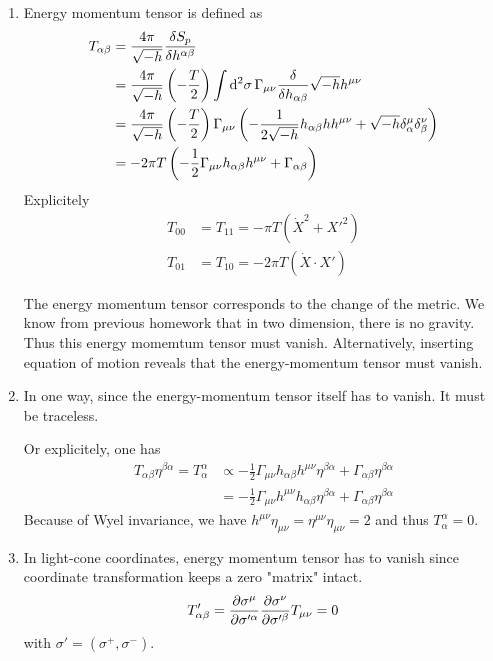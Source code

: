 \begin{enumerate}[label=(\alph*)]
	\item Energy momentum tensor is defined as 
		\begin{align}
			T_{\alpha\beta} &= \frac{4\pi}{\sqrt{-h}} \frac{\delta S_p}{\delta h^{\alpha\beta}} \notag \\
								 &= \frac{4\pi}{\sqrt{-h}} \left( - \frac{T}{2} \right) \int \dd[2]{\sigma} \Gamma_{\mu\nu} \frac{\delta}{\delta h_{\alpha\beta}} \sqrt{-h} h^{\mu\nu} \notag \\
								 &= \frac{4\pi}{\sqrt{-h}} \left( - \frac{T}{2} \right) \Gamma_{\mu\nu} \left( - \frac{1}{2\sqrt{-h}} h_{\alpha\beta} h  h^{\mu\nu}     + \sqrt{-h} \delta^\mu_\alpha \delta^\nu_\beta \right) \notag \\
								 &= - 2 \pi T \left( - \frac{1}{2} \Gamma_{\mu\nu} h_{\alpha\beta} h^{\mu\nu} + \Gamma_{\alpha\beta} \right) 
		\end{align}
		Explicitely
		\begin{align*}
			T_{00} &= T_{11} = - \pi T (\dot{X}^2 + X'^2)\\
			T_{01} &= T_{10} = -2\pi T (\dot{X} \cdot X')
		\end{align*}

		The energy momentum tensor corresponds to the change of the metric. We know from previous homework that in two dimension, there is no gravity. Thus this energy momemtum tensor must vanish. Alternatively, inserting equation of motion reveals that the energy-momentum tensor must vanish.


	\item In one way, since the energy-momentum tensor itself has to vanish. It must be traceless.
		
		Or explicitely, one has 
		\begin{align*}
			T_{\alpha\beta} \eta^{\beta \alpha} = T^{\alpha}_{\alpha} &\propto - \frac{1}{2} \Gamma_{\mu\nu} h_{\alpha\beta} h^{\mu\nu} \eta^{\beta\alpha}  + \Gamma_{\alpha\beta} \eta^{\beta\alpha} \\
																						 &= - \frac{1}{2} \Gamma_{\mu\nu} h^{\mu\nu} h_{\alpha\beta} \eta^{\beta\alpha} + \Gamma_{\alpha\beta} \eta^{\beta\alpha}
		\end{align*}
		Because of Wyel invariance, we have $h^{\mu\nu} \eta_{\mu\nu} = \eta^{\mu\nu} \eta_{\mu\nu} = 2$ and thus $T_\alpha^{\alpha} = 0$.

	\item In light-cone coordinates, energy momentum tensor has to vanish since coordinate transformation keeps a zero "matrix" intact.
		\begin{equation}
			T'_{\alpha \beta} = \pdv{\sigma^\mu}{\sigma'^\alpha} \pdv{\sigma^\nu}{\sigma'^\beta} T_{\mu\nu} = 0
		\end{equation}
		with $\sigma'=(\sigma^+, \sigma^-)$.


\end{enumerate}
